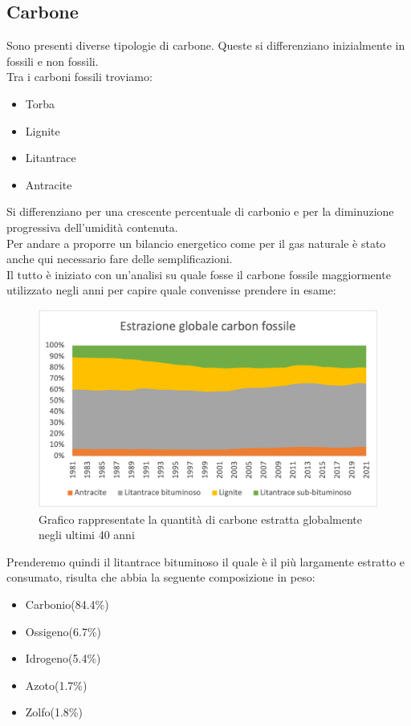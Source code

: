 \subsection{Carbone}
Sono presenti diverse tipologie di carbone. Queste si differenziano inizialmente in fossili e non fossili.\\
Tra i carboni fossili troviamo:
\begin{itemize}
    \item Torba
    \item Lignite
    \item Litantrace
    \item Antracite
\end{itemize}
Si differenziano per una crescente percentuale di carbonio e per la diminuzione progressiva dell'umidità contenuta.\\
Per andare a proporre un bilancio energetico come per il gas naturale è stato anche qui necessario fare delle semplificazioni.\\
\vfill
\newpage
Il tutto è iniziato con un'analisi su quale fosse il carbone fossile maggiormente utilizzato negli anni per capire quale convenisse prendere in esame:\cite{EIA-Statistics-World}\\
\begin{figure}[H]
    \centering
    \includegraphics[height=0.6\textwidth]{res/cap 2/Grafico carbone}
    \caption{Grafico rappresentate la quantità di carbone estratta globalmente negli ultimi 40 anni}
\end{figure}\noindent
Prenderemo quindi il litantrace bituminoso il quale è il più largamente estratto e consumato, risulta che abbia la seguente composizione in peso:\cite{Composizione-antracite}\\
\begin{itemize}
    \item Carbonio(84.4\%)
    \item Ossigeno(6.7\%)
    \item Idrogeno(5.4\%)
    \item Azoto(1.7\%)
    \item Zolfo(1.8\%)
\end{itemize}
